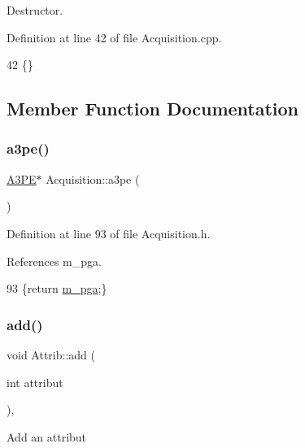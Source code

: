 Destructor. 



Definition at line 42 of file Acquisition.\+cpp.


\begin{DoxyCode}
42 \{\} 
\end{DoxyCode}


\subsection{Member Function Documentation}
\mbox{\label{classAcquisition_a8af496b6202d2509814e3b02197a5e73}} 
\subsubsection{\texorpdfstring{a3pe()}{a3pe()}}
{\footnotesize\ttfamily \hyperlink{classA3PE}{A3\+PE}$\ast$ Acquisition\+::a3pe (\begin{DoxyParamCaption}{ }\end{DoxyParamCaption})\hspace{0.3cm}{\ttfamily [inline]}}



Definition at line 93 of file Acquisition.\+h.



References m\+\_\+pga.


\begin{DoxyCode}
93 \{\textcolor{keywordflow}{return} \hyperlink{classAcquisition_aac113fd42c6574cdb4154e9808a21b67}{m\_pga};\}
\end{DoxyCode}
\mbox{\label{classAttrib_a235f773af19c900264a190b00a3b4ad7}} 
\subsubsection{\texorpdfstring{add()}{add()}}
{\footnotesize\ttfamily void Attrib\+::add (\begin{DoxyParamCaption}\item[{int}]{attribut }\end{DoxyParamCaption})\hspace{0.3cm}{\ttfamily [inline]}, {\ttfamily [inherited]}}

Add an attribut 

